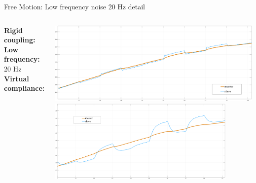 \documentclass[10pt]{beamer}
\begin{document}
\begin{frame}{Free Motion: Low frequency noise 20 Hz detail}
  \smallskip
  \begin{columns}
    \color{Orange}\textbf{Rigid coupling:}\\
    \bigskip
    \bigskip
    \bigskip
    \color{black}\textbf{Low frequency:} 20 Hz\\
    \bigskip
    \bigskip
    \bigskip
    \color{LightBlue}\textbf{Virtual compliance:}\\

    
    \includegraphics[width=\textwidth,
    height=0.45\textwidth]{../reportTeleop/Images/freerigidPart20Htznoise}\\
    \smallskip
    \includegraphics[width=\textwidth,
    height=0.45\textwidth]{../reportTeleop/Images/freeSet20Part20Htznoise}
  \end{columns}
\end{frame}
\end{document}
